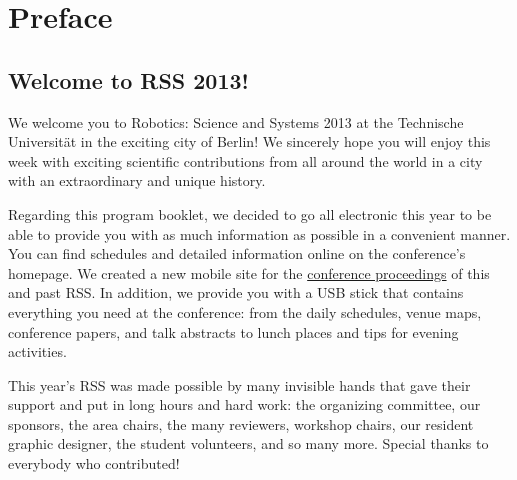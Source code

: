 
\chapter*{Preface}


                                                                     
                                             
\vspace{3cm}
\section*{Welcome to RSS 2013!}
\begingroup{}
\Large
\vspace{1cm}

We welcome you to Robotics: Science and Systems 2013 at the Technische Universit\"at in the exciting city of Berlin!  We sincerely hope you will enjoy this week with exciting scientific contributions from all around the world in a city with an extraordinary and unique history.

Regarding this program booklet, we decided to go all electronic this year to be able to provide you with as much information as possible in a convenient manner. You can find schedules and detailed information online on the conference's homepage. We created a new mobile site for the \href{http://www.roboticsproceedings.org}{conference proceedings} of this and past RSS. In addition, we provide you with a USB stick that contains everything you need at the conference: from the daily schedules, venue maps, conference papers, and talk abstracts to lunch places and tips for evening activities.


This year's RSS was made possible by many invisible hands that gave their support and put in long hours and hard work: the organizing committee, our sponsors, the area chairs, the many reviewers, workshop chairs, our resident graphic designer, the student volunteers, and so many more. Special thanks to everybody who contributed!

